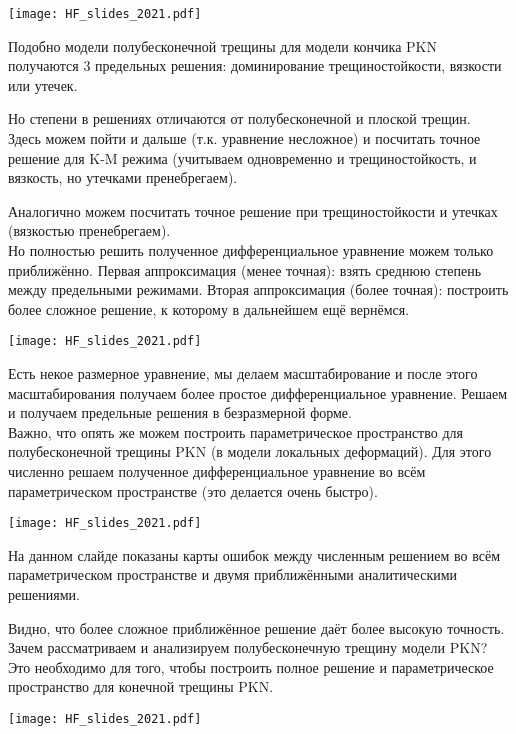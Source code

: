 \documentclass[main.tex]{subfiles}
\begin{document}
\texttt{[image: HF\_slides\_2021.pdf]}

Подобно модели полубесконечной трещины для модели кончика PKN получаются 3 предельных решения:
доминирование трещиностойкости, вязкости или утечек.

Но степени в решениях отличаются от полубесконечной и плоской трещин.
\\

Здесь можем пойти и дальше (т.к. уравнение несложное) и посчитать точное решение для K-M режима (учитываем одновременно и трещиностойкость, и вязкость, но утечками пренебрегаем).

Аналогично можем посчитать точное решение при трещиностойкости и утечках (вязкостью пренебрегаем).
\\

Но полностью решить полученное дифференциальное уравнение можем только приближённо.
Первая аппроксимация (менее точная): взять среднюю степень между предельными режимами.
Вторая аппроксимация (более точная): построить более сложное решение, к которому в дальнейшем ещё вернёмся.

\texttt{[image: HF\_slides\_2021.pdf]}

Есть некое размерное уравнение, мы делаем масштабирование и после этого масштабирования получаем более простое дифференциальное уравнение.
Решаем и получаем предельные решения в безразмерной форме.
\\

Важно, что опять же можем построить параметрическое пространство для полубесконечной трещины PKN (в модели локальных деформаций).
Для этого численно решаем полученное дифференциальное уравнение во всём параметрическом пространстве (это делается очень быстро).

\texttt{[image: HF\_slides\_2021.pdf]}

На данном слайде показаны карты ошибок между численным решением во всём параметрическом пространстве и двумя приближёнными аналитическими решениями.

Видно, что более сложное приближённое решение даёт более высокую точность.
\\

Зачем рассматриваем и анализируем полубесконечную трещину модели PKN?
Это необходимо для того, чтобы построить полное решение и параметрическое пространство для конечной трещины PKN.

\texttt{[image: HF\_slides\_2021.pdf]}
\end{document}
